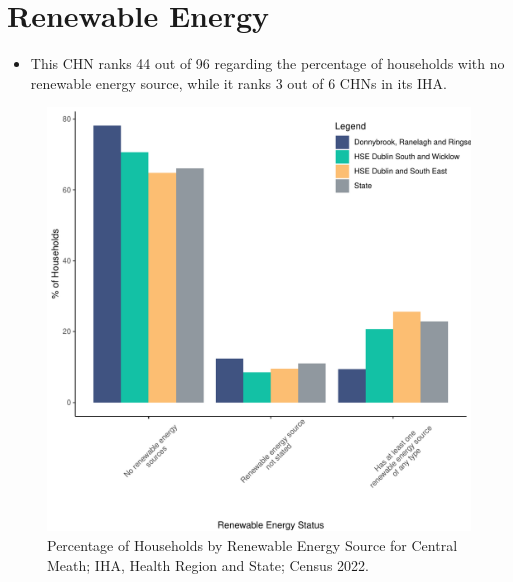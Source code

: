 \documentclass{article}
\begin{document}
\section{Renewable Energy}\label{sect:RE}
\begin{itemize}
\item This CHN ranks  44 out of 96 regarding the percentage of households with no renewable energy source, while it ranks   3 out of 6 CHNs in its IHA.
\end{itemize}
\begin{figure}[H]
	\centering
	\includegraphics[width = 140mm]{../figures/RenewableEnergyED.pdf}
	\caption{Percentage of Households by Renewable Energy Source for Central Meath; IHA, Health Region and State; Census 2022.}
	\label{fig:vbnv}
	\end{figure}
\end{document}
